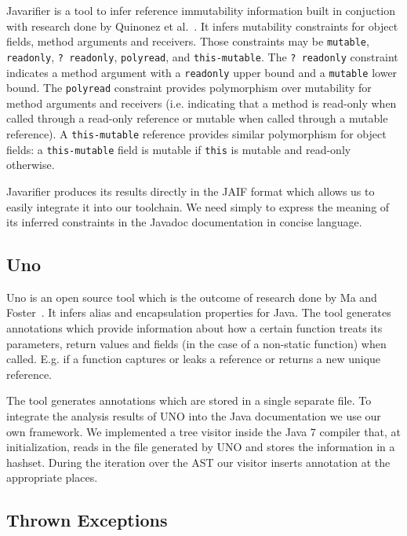 Javarifier is a tool to infer reference immutability information built in
conjuction with research done by Quinonez et al.~\cite{Javarifier}. It infers
mutability constraints for object fields, method arguments and receivers. Those
constraints may be \texttt{mutable}, \texttt{readonly}, \texttt{?~readonly},
\texttt{polyread}, and \texttt{this-mutable}. The \texttt{?~readonly}
constraint indicates a method argument with a \texttt{readonly} upper bound and
a \texttt{mutable} lower bound. The \texttt{polyread} constraint provides
polymorphism over mutability for method arguments and receivers
(i.e. indicating that a method is read-only when called through a read-only
reference or mutable when called through a mutable reference). A
\texttt{this-mutable} reference provides similar polymorphism for object
fields: a \texttt{this-mutable} field is mutable if \texttt{this} is mutable
and read-only otherwise.

Javarifier produces its results directly in the JAIF format which allows us to
easily integrate it into our toolchain. We need simply to express the meaning
of its inferred constraints in the Javadoc documentation in concise language.

\subsection{Uno}

Uno is an open source tool which is the outcome of research done by Ma and
Foster~\cite{Uno}. It infers alias and encapsulation properties for Java.  The
tool generates annotations which provide information about how a certain
function treats its parameters, return values and fields (in the case of a
non-static function) when called. E.g. if a function captures or leaks a
reference or returns a new unique reference.

The tool generates annotations which are stored in a single separate file. 
To integrate the analysis results of UNO into the Java documentation we
use our own framework. We implemented a tree visitor inside the Java 7 
compiler that, at initialization, reads in the file generated by UNO and 
stores the information in a hashset. During the iteration over the AST
our visitor inserts annotation at the appropriate places.

\subsection{Thrown Exceptions}

